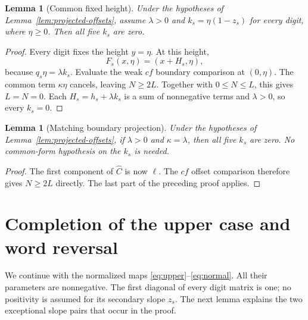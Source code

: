 \documentclass[11pt,a4paper]{article}
\newtheorem{lemma}[theorem]{Lemma}
\begin{document}
\begin{lemma}[Common fixed height]\label{lem:common-form-zero}
Under the hypotheses of Lemma~\ref{lem:projected-offsets},
assume \(\lambda>0\) and
\(k_s=\eta(1-z_s)\) for every digit, where \(\eta\ge0\).
Then all five \(k_s\) are zero.
\end{lemma}
\begin{proof}
Every digit fixes the height \(y=\eta\). At this height,
\[
F_s(x,\eta)=(x+H_s,\eta),
\]
because \(q_s\eta=\lambda k_s\).
Evaluate the weak \(cf\) boundary comparison at \((0,\eta)\).
The common term \(\kappa\eta\) cancels, leaving \(N\ge2L\).
Together with \(0\le N\le L\), this gives \(L=N=0\).
Each \(H_s=h_s+\lambda k_s\) is a sum of nonnegative terms and
\(\lambda>0\), so every \(k_s=0\).
\end{proof}

\begin{lemma}[Matching boundary projection]\label{lem:matching-boundary-zero}
Under the hypotheses of Lemma~\ref{lem:projected-offsets},
if \(\lambda>0\) and \(\kappa=\lambda\), then all five \(k_s\) are zero.
No common-form hypothesis on the \(k_s\) is needed.
\end{lemma}
\begin{proof}
The first component of \(\widehat C\) is now \(\ell\).
The \(cf\) offset comparison therefore gives \(N\ge2L\) directly.
The last part of the preceding proof applies.
\end{proof}


\section{Completion of the upper case and word reversal}
\label{sec:upper-completion}
We continue with the normalized maps \eqref{eq:upper}--\eqref{eq:normal}.
All their parameters are nonnegative. The first diagonal of every digit
matrix is one; no positivity is assumed for its secondary slope $z_s$.
The next lemma explains the two exceptional slope pairs that occur in
the proof.
\end{document}
